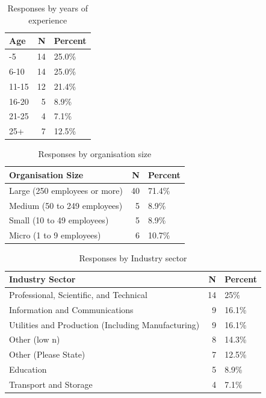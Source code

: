 \documentclass[
  a4paper,
]{book}
\begin{document}
\begin{longtable}[]{@{}lrl@{}}

\caption{\label{tbl-responses-experience}Responses by years of
experience}

\tabularnewline

\toprule\noalign{}
Age & N & Percent \\
\midrule\noalign{}
\endhead
\bottomrule\noalign{}
\endlastfoot
0-5 & 14 & 25.0\% \\
6-10 & 14 & 25.0\% \\
11-15 & 12 & 21.4\% \\
16-20 & 5 & 8.9\% \\
21-25 & 4 & 7.1\% \\
25+ & 7 & 12.5\% \\

\end{longtable}

\begin{longtable}[]{@{}lrl@{}}

\caption{\label{tbl-responses-org-size}Responses by organisation size}

\tabularnewline

\toprule\noalign{}
Organisation Size & N & Percent \\
\midrule\noalign{}
\endhead
\bottomrule\noalign{}
\endlastfoot
Large (250 employees or more) & 40 & 71.4\% \\
Medium (50 to 249 employees) & 5 & 8.9\% \\
Small (10 to 49 employees) & 5 & 8.9\% \\
Micro (1 to 9 employees) & 6 & 10.7\% \\

\end{longtable}

\begin{longtable}[]{@{}lrl@{}}

\caption{\label{tbl-responses-industry}Responses by Industry sector}

\tabularnewline

\toprule\noalign{}
Industry Sector & N & Percent \\
\midrule\noalign{}
\endhead
\bottomrule\noalign{}
\endlastfoot
Professional, Scientific, and Technical & 14 & 25\% \\
Information and Communications & 9 & 16.1\% \\
Utilities and Production (Including Manufacturing) & 9 & 16.1\% \\
Other (low n) & 8 & 14.3\% \\
Other (Please State) & 7 & 12.5\% \\
Education & 5 & 8.9\% \\
Transport and Storage & 4 & 7.1\% \\

\end{longtable}
\end{document}
